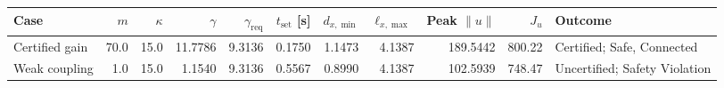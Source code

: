 \begin{tabular}{@{}lrrrrrrrrrl@{}}\toprule
Case & $m$ & $\kappa$ & $\gamma$ & $\gamma_{\mathrm{req}}$ & $t_{\mathrm{set}}$ [s] & $d_{x,\min}$ & $\ell_{x,\max}$ & Peak $\|u\|$ & $J_u$ & Outcome \\\midrule
Certified gain & 70.0 & 15.0 & 11.7786 & 9.3136 & 0.1750 & 1.1473 & 4.1387 & 189.5442 & 800.22 & Certified; Safe, Connected \\
Weak coupling & 1.0 & 15.0 & 1.1540 & 9.3136 & 0.5567 & 0.8990 & 4.1387 & 102.5939 & 748.47 & Uncertified; Safety Violation \\
\bottomrule\end{tabular}
